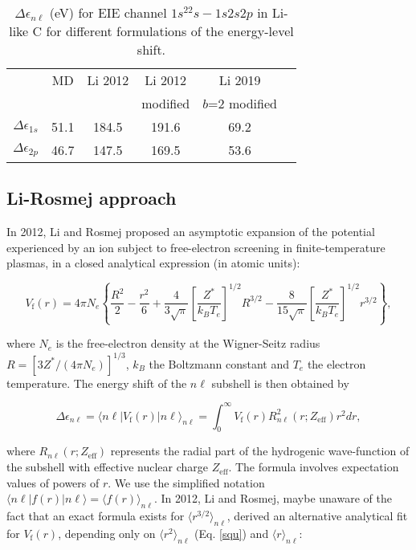 \documentclass[a4paper,10pt]{article}
\begin{document}
\begin{table}
\begin{center}
\begin{tabular}{|c|c|c|c|c|c|}\hline
& \;\;MD\;\; & Li 2012 & Li 2012 & Li 2019 \\
& & & modified & $b$=2 modified \\\hline
\;\;$\Delta\epsilon_{1s}$\;\; & 51.1 & 184.5 & 191.6 & 69.2 \\
\;\;$\Delta\epsilon_{2p}$\;\; & 46.7 & 147.5 & 169.5 & 53.6 \\\hline
\end{tabular}
\end{center}
\caption{$\Delta\epsilon_{n\ell}$ (eV) for EIE channel $1s^22s - 1s2s2p$ in Li-like C for different formulations of the energy-level shift.}\label{lilikec}
\end{table}

\subsection{Li-Rosmej approach}\label{subsec42}

In 2012, Li and Rosmej proposed an asymptotic expansion of the potential experienced by an ion subject to free-electron screening in finite-temperature plasmas, in a closed analytical expression \cite{ROSMEJ11} (in atomic units):

\begin{equation}\label{ros}
V_{\mathrm{f}}(r)=4\pi N_e\left\{\frac{R^2}{2}-\frac{r^2}{6}+\frac{4}{3\sqrt{\pi}}\left[\frac{Z^*}{k_BT_e}\right]^{1/2}R^{3/2}-\frac{8}{15\sqrt{\pi}}\left[\frac{Z^*}{k_BT_e}\right]^{1/2}r^{3/2}\right\},
\end{equation}

\noindent where $N_e$ is the free-electron density at the Wigner-Seitz radius $R=\left[3Z^*/\left(4\pi N_e\right)\right]^{1/3}$, $k_B$ the Boltzmann constant and $T_e$ the electron temperature. The energy shift of the $n\ell$ subshell is then obtained by

\begin{equation}\label{delte}
\Delta\epsilon_{n\ell}=\langle n\ell|V_{\mathrm{f}}(r)|n\ell\rangle_{n\ell}=\int_0^{\infty}V_{\mathrm{f}}(r)R_{n\ell}^2\left(r;Z_{\mathrm{eff}}\right)r^2dr,
\end{equation}

\noindent where $R_{n\ell}\left(r;Z_{\mathrm{eff}}\right)$ represents the radial part of the hydrogenic wave-function of the subshell with effective nuclear charge $Z_{\mathrm{eff}}$. The formula involves expectation values of powers of $r$. We use the simplified notation $\langle n\ell|f(r)|n\ell\rangle=\langle f(r)\rangle_{n\ell}$. In 2012, Li and Rosmej, maybe unaware of the fact that an exact formula exists for $\langle r^{3/2}\rangle_{n\ell}$, derived an alternative analytical fit for $V_{\mathrm{f}}(r)$, depending only on $\langle r^2\rangle_{n\ell}$ (Eq. \ref{squ}) and $\langle r\rangle_{n\ell}$:
\end{document}
